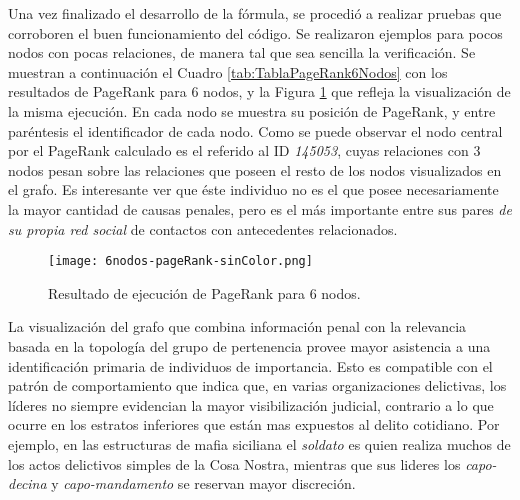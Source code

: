 Una vez finalizado el desarrollo de la fórmula, se procedió a realizar pruebas que corroboren el buen funcionamiento del código. Se realizaron ejemplos para pocos nodos con pocas relaciones, de manera tal que sea sencilla la verificación. Se muestran a continuación el Cuadro \ref{tab:TablaPageRank6Nodos} con los resultados de PageRank para 6 nodos, y la Figura \ref{fig:6nodos-pageRank-sinColor} que refleja la visualización de la misma ejecución. En cada nodo se muestra su posición de PageRank, y entre paréntesis el identificador de cada nodo. Como se puede observar el nodo central por el PageRank calculado es el referido al ID \textit{145053}, cuyas relaciones con 3 nodos pesan sobre las relaciones que poseen el resto de los nodos visualizados en el grafo.
Es interesante ver que éste individuo no es el que posee necesariamente la mayor cantidad de causas penales, pero es el más importante entre sus pares \textit{de su propia red social} de contactos con antecedentes relacionados.
\begin{table}
\centering
{}
\vspace{5pt}
\caption{Valores de PageRank por nodo luego de la ejecución del algoritmo}
\end{table}

\begin{figure}
	\centering
	\texttt{[image: 6nodos-pageRank-sinColor.png]}
	\caption{Resultado de ejecución de PageRank para 6 nodos.} 
	\label{fig:6nodos-pageRank-sinColor}
\end{figure}

La visualización del grafo que combina información penal con la relevancia basada en la topología del grupo de pertenencia provee mayor asistencia a una identificación primaria de individuos de importancia.
Esto es compatible con el patrón de comportamiento que indica que, en varias organizaciones delictivas, los líderes no siempre evidencian la mayor visibilización judicial, contrario a lo que ocurre en los estratos inferiores que están mas expuestos al delito cotidiano. Por ejemplo, en las estructuras de mafia siciliana el \textit{soldato} es quien realiza muchos de los actos delictivos simples de la Cosa Nostra, mientras que sus lideres los \textit{capo-decina} y \textit{capo-mandamento} se reservan mayor discreción. 



